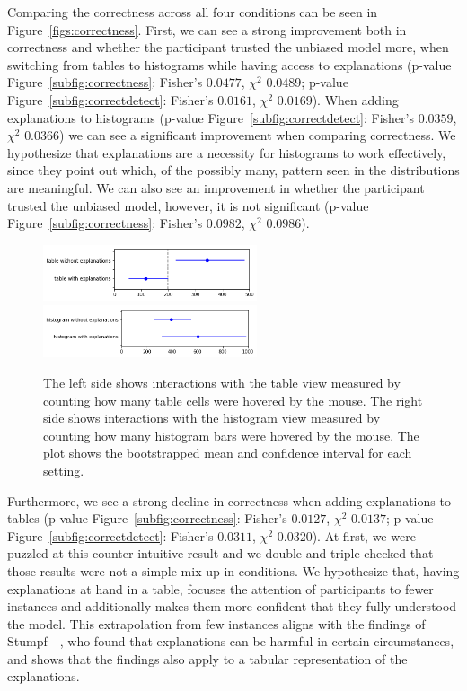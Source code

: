 Comparing the correctness across all four conditions can be seen in Figure~\ref{figs:correctness}.
First, we can see a strong improvement both in correctness and whether the participant trusted the unbiased model more, when switching from tables to histograms while having access to explanations (p-value Figure~\ref{subfig:correctness}: Fisher's $0.0477$, $\chi^2$ $0.0489$; p-value Figure~\ref{subfig:correctdetect}: Fisher's $0.0161$, $\chi^2$ $0.0169$).
When adding explanations to histograms (p-value Figure~\ref{subfig:correctdetect}: Fisher's $0.0359$, $\chi^2$ $0.0366$) we can see a significant improvement when comparing correctness.
We hypothesize that explanations are a necessity for histograms to work effectively, since they point out which, of the possibly many, pattern seen in the distributions are meaningful.
We can also see an improvement in whether the participant trusted the unbiased model, however, it is not significant (p-value Figure~\ref{subfig:correctness}: Fisher's $0.0982$, $\chi^2$ $0.0986$).

\begin{figure}
\centering
\includegraphics[width=17em]{aggexplain/stats/table_interaction}%
\hfill%
\includegraphics[width=17em]{aggexplain/stats/histogram_interaction}%
\caption[Interactions with the table and histogram views.]{
The left side shows interactions with the table view measured by counting how many table cells were hovered by the mouse.
The right side shows interactions with the histogram view measured by counting how many histogram bars were hovered by the mouse.
The plot shows the bootstrapped mean and confidence interval for each setting.
}
\label{figs:table_interaction}
\end{figure}

Furthermore, we see a strong decline in correctness when adding explanations to tables (p-value Figure~\ref{subfig:correctness}: Fisher's $0.0127$, $\chi^2$ $0.0137$; p-value Figure~\ref{subfig:correctdetect}: Fisher's $0.0311$, $\chi^2$ $0.0320$).
At first, we were puzzled at this counter-intuitive result and we double and triple checked that those results were not a simple mix-up in conditions.
We hypothesize that, having explanations at hand in a table, focuses the attention of participants to fewer instances and additionally makes them more confident that they fully understood the model.
This extrapolation from few instances aligns with the findings of Stumpf~\etal~\cite{harmful}, who found that explanations can be harmful in certain circumstances, and shows that the findings also apply to a tabular representation of the explanations.

